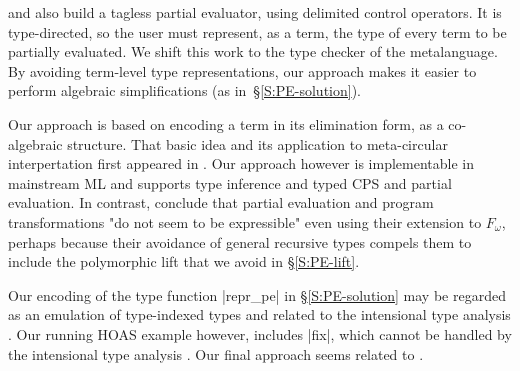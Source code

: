  and \citet{balat:tdpe-popl2004} also build
a tagless partial evaluator, using delimited control operators.  It is
type-directed, so the user must represent, as a term, the type of every
term to be partially evaluated.  We shift this work to the type checker
of the metalanguage.  By avoiding term-level type representations, our
approach makes it easier to perform algebraic simplifications (as
in~\S\ref{S:PE-solution}).


Our approach is based on encoding a term in its elimination form, as a
co-algebraic structure. That basic idea and its application to
meta-circular interpertation first appeared in \citet{Pfenning-Lee}.
Our approach however is implementable in mainstream ML and supports
type inference and typed CPS and partial evaluation. In contrast,
\cite{Pfenning-Lee} conclude that partial evaluation and program
transformations "do not seem to be expressible" even using their
extension to $F_{\omega}$, perhaps because their avoidance of general
recursive types compels them to include the polymorphic lift that we
avoid in \S\ref{S:PE-lift}.
\begin{comment}
It seems that Pfenning and Lee embed $F_2$ with type constructions in 
(pure) $F_3$.  We embed $F_1$ in (weak?) $F_2$, as I see it.  In a way, what 
we do is very similar to what they do (Figure 1, p.152), except that we 
do it in standard programming languges.  It is unclear if their work can 
be implemented (yet) in any language.  And we preserve type-inference, 
while their solution needs explcit types!
The following line of their conclusion is worth citing: "... this does 
not imply that the same language is also suitable for type 
metaprogramming. ... such as partial evaluation... do not seem to be 
expressible".
I suspect you're right, but I'm still reading the paper.  See also page
146: "for a term M in $F_1$ (a simply-typed term), the representation
$\bar{M}$ will be in $F_2$".  The move from $F_2$ to $F_3$ 
and beyond reminds me
strongly of our attempts at self-interpretation without the notion of a
syntactic hole.
\end{comment}

Our encoding of the type function |repr_pe| in \S\ref{S:PE-solution}
may be regarded as an emulation of type-indexed types and related to
the intensional type analysis
\cite{Morrisett-intensional,Generic-Haskell}. Our running HOAS
example however, includes |fix|, which cannot be handled by the
intensional type analysis \cite{xi-guarded}.  Our final approach
seems related to \cite{Washburn-Weirich-boxes}.


